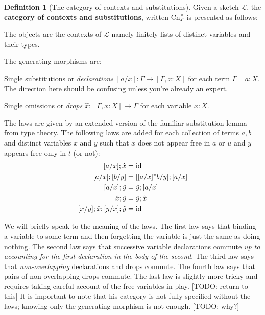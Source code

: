 \documentclass[12pt,twoside]{reedthesis}
\theoremstyle{definition}
\newtheorem{definition}{Definition}
\theoremstyle{remark}
\theoremstyle{theorem}
\begin{document}
\begin{definition}[The category of contexts and substitutions]\label{def:syn cat}
  Given a sketch $\mathcal{L}$, the \textbf{category of contexts and substitutions}, written \( \text{Cn}^{\times}_{\mathcal{L}}\) is presented as follows:
  \begin{outline}
    \1 The objects are the contexts of \( \mathcal{L} \) namely finitely lists
    of distinct variables and their types.

    \1 The generating morphisms are:

      \2 Single substitutions or \emph{declarations} \( [a/x] : \Gamma \rightarrow [\Gamma, x:X] \) for each term
      \( \Gamma \vdash a : X \). The direction here should be confusing unless you're already an expert.

      \2 Single omissions or \emph{drops} \( \hat{x} : [\Gamma, x : X] \rightarrow \Gamma \) for
      each variable $x:X$.

    \1 The laws are given by an extended version of the familiar substitution
      lemma from type theory. The following laws are added for each collection
      of terms $a,b$ and distinct variables $x$ and $y$ such that $x$ does
      not appear free in $a$ or $u$ and $y$ appears free only in $t$ (or not):
    \begin{align*}
      [a/x] ; \hat{x} &= \text{id} \\
      [a/x] ; [b/y]   &= [ [ a/x ]^{*} b/y ] ; [a/x] \\
      [a/x]; \hat{y} &= \hat{y}; [a/x] \\
      \hat{x}; \hat{y} &= \hat{y}; \hat{x} \\
      [x/y]; \hat{x}; [y/x]; \hat{y} &= \text{id}
    \end{align*}
  \end{outline}
  We will briefly speak to the meaning of the laws. The first law says that
  binding a variable to some term and then forgetting the variable is just the
  same as doing nothing. The second law says that successive variable
  declarations commute \emph{up to accounting for the first declaration in the
    body of the second}. The third law says that \emph{non-overlapping}
  declarations and drops commute. The fourth law says that pairs of
  non-overlapping drops commute. The last law is slightly more tricky and
  requires taking careful account of the free variables in play. [TODO: return
  to this] It is important to note that his category is not fully specified
  without the laws; knowing only the generating morphism is not enough. [TODO:
  why?]
\end{definition}
\end{document}
